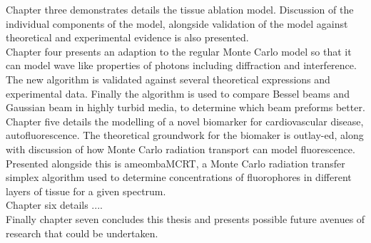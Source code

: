 Chapter three demonstrates details the tissue ablation model.
Discussion of the individual components of the model, alongside validation of the model against theoretical and experimental evidence is also presented.\\


Chapter four presents an adaption to the regular Monte Carlo model so that it can model wave like properties of photons including diffraction and interference.
The new algorithm is validated against several theoretical expressions and experimental data.
Finally the algorithm is used to compare Bessel beams and Gaussian beam in highly turbid media, to determine which beam preforms better.\\


Chapter five details the modelling of a novel biomarker for cardiovascular disease, autofluorescence.
The theoretical groundwork for the biomaker is outlay-ed, along with discussion of how Monte Carlo radiation transport can model fluorescence.
Presented alongside this is ameombaMCRT, a Monte Carlo radiation transfer simplex algorithm used to determine concentrations of fluorophores in different layers of tissue for a given spectrum.\\


Chapter six details ....\\


Finally chapter seven concludes this thesis and presents possible future avenues of research that could be undertaken.